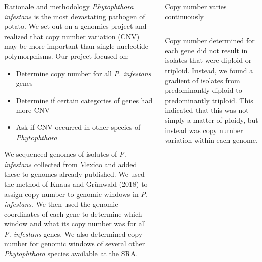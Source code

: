 
\begin{columns}[t]
  \begin{column}{0.44\textwidth}
    \begin{block}{\large Rationale and methodology}
\scriptsize
\textit{Phytophthora infestans} is the most devastating pathogen of potato.
We set out on a genomics project and realized that copy number variation (CNV) may be more important than single nucleotide polymorphisms.
Our project focused on:
\vspace{5mm}

\begin{itemize}
\item Determine copy number for all \textit{P. infestans} genes
\item Determine if certain categories of genes had more CNV
\item Ask if CNV occurred in other species of \textit{Phytophthora}
\end{itemize}

\vspace{10mm}

\tiny
We sequenced genomes of isolates of \textit{P. infestans} collected from Mexico and added these to genomes already published.
We used the method of Knaus and Gr\"unwald (2018) to assign copy number to genomic windows in \textit{P. infestans}.
We then used the genomic coordinates of each gene to determine which window and what its copy number was for all \textit{P. infestans} genes.
We also determined copy number for genomic windows of several other \textit{Phytophthora} species available at the SRA.
\vspace{20mm}
    \end{block}
  \end{column}

  \begin{column}{0.5\textwidth}
    \begin{block}{\large Copy number varies continuously}
      \begin{columns}
        \begin{column}{0.50\textwidth}
\scriptsize
\vspace{5mm}

Copy number determined for each gene did not result in isolates that were diploid or triploid.
Instead, we found a gradient of isolates from predominantly diploid to predominantly triploid.
This indicated that this was not simply a matter of ploidy, but instead was copy number variation within each genome.


\end{column}
\end{columns}
\end{block}
\end{column}
\end{columns}
